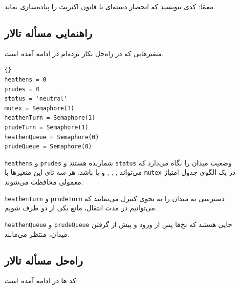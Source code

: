 \documentclass{book}
\newcommand{\clearemptydoublepage}{\newpage\cleardoublepage}
\begin{document}
    معمّا: کدی بنویسید که انحصار دسته‌ای با قانون اکثریت را پیاده‌سازی نماید. 



\clearemptydoublepage
\subsection{راهنمایی مسأله تالار  }

    متغیرهایی که در راه‌حل بکار برده‌ام در ادامه آمده است. 

\begin{latin}
\begin{lstlisting}[title=\rl{راهنمایی مسأله تالار \lr{Modus}}]{}
heathens = 0
prudes = 0
status = 'neutral'
mutex = Semaphore(1)
heathenTurn = Semaphore(1)
prudeTurn = Semaphore(1)
heathenQueue = Semaphore(0)
prudeQueue = Semaphore(0)
\end{lstlisting}
\end{latin}

    {\tt heathens} و {\tt prudes} 
    شمارنده هستند و  {\tt status} وضعیت میدان را نگاه می‌دارد که می‌تواند 
    , ,
    ,  و یا  باشد.
    هر سه تای این متغیرها با {\tt mutex} در یک الگوی جدول امتیاز معمولی محافظت می‌شوند. 
    


    {\tt heathenTurn} و {\tt prudeTurn} 
    دسترسی به میدان را به نحوی کنترل می‌نمایند که می‌توانیم در مدت انتقال، مانع یکی از دو طرف شویم. 

    {\tt heathenQueue} و {\tt prudeQueue}
    جایی هستند که نخ‌ها پس از ورود و پیش از گرفتن میدان، منتظر می‌مانند. 
    

\clearemptydoublepage
\subsection{راه‌حل مسأله تالار  }

    کد ها در ادامه آمده است:‌ 
\end{document}
